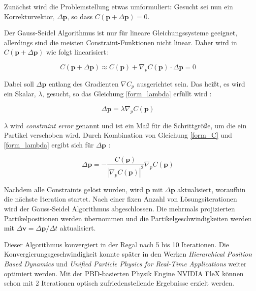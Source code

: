Zunächst wird die Problemstellung etwas umformuliert: Gesucht sei nun ein Korrekturvektor, $\Delta \textbf{p}$, so dass $C(\textbf{p}+\Delta \textbf{p})=0$. 

Der Gauss-Seidel Algorithmus ist nur für lineare Gleichungssysteme geeignet, allerdings sind die meisten Constraint-Funktionen nicht linear. Daher wird in \newline \cite{PBD} $C(\textbf{p}+\Delta \textbf{p})$ wie folgt linearisiert:

\begin{equation}
C(\textbf{p}+\Delta \textbf{p}) \approx C(\textbf{p}) + \nabla_p C(\textbf{p}) \cdot \Delta \textbf{p} = 0
\label{form_C}
\end{equation}

Dabei soll $\Delta \textbf{p}$ entlang des Gradienten $\nabla C_p$ ausgerichtet sein. Das heißt, es wird ein Skalar, $\lambda$, gesucht, so das Gleichung \ref{form_lambda} erfüllt wird \cite{PBD}:

\begin{equation}
\Delta \textbf{p} = \lambda \nabla_p C(\textbf{p})
\label{form_lambda}
\end{equation}

$\lambda$ wird \textit{constraint error} genannt und ist ein Maß für die Schrittgröße, um die ein Partikel verschoben wird. Durch Kombination von Gleichung \ref{form_C} und \ref{form_lambda} ergibt sich für $\Delta \textbf{p}$ \cite{PBD}:

\begin{equation}
\Delta \textbf{p} = - \frac{C(\textbf{p})}{|\nabla_p C(\textbf{p})|^2} \nabla_p C(\textbf{p}) 
\label{form_db}
\end{equation}

Nachdem alle Constraints gelöst wurden, wird $\textbf{p}$ mit $\Delta \textbf{p}$ aktualisiert, woraufhin die nächste Iteration startet. Nach einer fixen Anzahl von Lösungsiterationen wird der Gauss-Seidel Algorithmus abgeschlossen. Die mehrmals projizierten Partikelpositionen werden übernommen und die Partikelgeschwindigkeiten werden mit $\Delta \textbf{v} = \Delta \textbf{p} / \Delta t$ aktualisiert.

Dieser Algorithmus konvergiert in der Regal nach 5 bis 10 Iterationen. Die Konvergierungsgeschwindigkeit konnte später in den Werken \textit{Hierarchical Position Based Dynamics} \cite{Mller2008HierarchicalPB} und \textit{Unified Particle Physics for Real-Time Applications} \cite{UPP} weiter optimiert werden. Mit der PBD-basierten Physik Engine NVIDIA FleX können schon mit 2 Iterationen optisch zufriedenstellende Ergebnisse erzielt werden.


